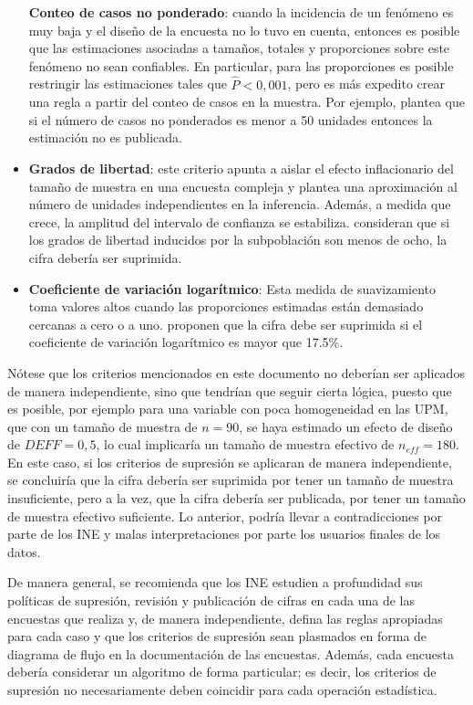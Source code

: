 \documentclass[
  12pt,
  spanish,
]{book}
\begin{document}
\begin{itemize}
  \textbf{Conteo de casos no ponderado}: cuando la incidencia de un fenómeno es muy baja y el diseño de la encuesta no lo tuvo en cuenta, entonces es posible que las estimaciones asociadas a tamaños, totales y proporciones sobre este fenómeno no sean confiables. En particular, para las proporciones es posible restringir las estimaciones tales que \(\hat P <0,001\), pero es más expedito crear una regla a partir del conteo de casos en la muestra. Por ejemplo, \citet{AmericanCommunitySurvey} plantea que si el número de casos no ponderados es menor a 50 unidades entonces la estimación no es publicada.
\item
  \textbf{Grados de libertad}: este criterio apunta a aislar el efecto inflacionario del tamaño de muestra en una encuesta compleja y plantea una aproximación al número de unidades independientes en la inferencia. Además, a medida que crece, la amplitud del intervalo de confianza se estabiliza. \citet{Parker_Talih_Malec_2017} consideran que si los grados de libertad inducidos por la subpoblación son menos de ocho, la cifra debería ser suprimida.
\item
  \textbf{Coeficiente de variación logarítmico}: Esta medida de suavizamiento toma valores altos cuando las proporciones estimadas están demasiado cercanas a cero o a uno. \citet{Barnett_Walker_Chromy_Davis_Emrich_Odom_Packer_2003} proponen que la cifra debe ser suprimida si el coeficiente de variación logarítmico es mayor que 17.5\%.
\end{itemize}

Nótese que los criterios mencionados en este documento no deberían ser aplicados de manera independiente, sino que tendrían que seguir cierta lógica, puesto que es posible, por ejemplo para una variable con poca homogeneidad en las UPM, que con un tamaño de muestra de \(n=90\), se haya estimado un efecto de diseño de \(DEFF=0,5\), lo cual implicaría un tamaño de muestra efectivo de \(n_{eff}=180\). En este caso, si los criterios de supresión se aplicaran de manera independiente, se concluiría que la cifra debería ser suprimida por tener un tamaño de muestra insuficiente, pero a la vez, que la cifra debería ser publicada, por tener un tamaño de muestra efectivo suficiente. Lo anterior, podría llevar a contradicciones por parte de los INE y malas interpretaciones por parte los usuarios finales de los datos.

De manera general, se recomienda que los INE estudien a profundidad sus políticas de supresión, revisión y publicación de cifras en cada una de las encuestas que realiza y, de manera independiente, defina las reglas apropiadas para cada caso y que los criterios de supresión sean plasmados en forma de diagrama de flujo en la documentación de las encuestas. Además, cada encuesta debería considerar un algoritmo de forma particular; es decir, los criterios de supresión no necesariamente deben coincidir para cada operación estadística.
\end{document}

